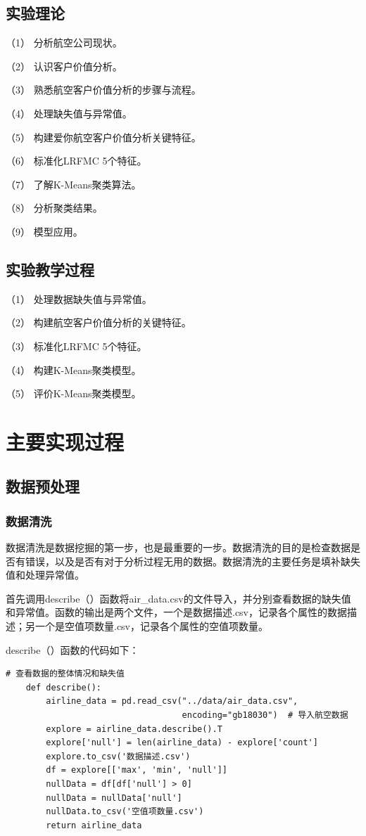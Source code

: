 \documentclass[UTF8,12pt]{article}
\begin{document}
\subsection{实验理论}
（1） 分析航空公司现状。

（2） 认识客户价值分析。

（3） 熟悉航空客户价值分析的步骤与流程。

（4） 处理缺失值与异常值。

（5） 构建爱你航空客户价值分析关键特征。

（6） 标准化LRFMC 5个特征。

（7） 了解K-Means聚类算法。

（8） 分析聚类结果。

（9） 模型应用。

\subsection{实验教学过程}
（1） 处理数据缺失值与异常值。

（2） 构建航空客户价值分析的关键特征。

（3） 标准化LRFMC 5个特征。

（4） 构建K-Means聚类模型。

（5） 评价K-Means聚类模型。

\section{主要实现过程}
\subsection{数据预处理}
\subsubsection{数据清洗}
数据清洗是数据挖掘的第一步，也是最重要的一步。数据清洗的目的是检查数据是否有错误，以及是否有对于分析过程无用的数据。数据清洗的主要任务是填补缺失值和处理异常值。

首先调用describe（）函数将air\_data.csv的文件导入，并分别查看数据的缺失值和异常值。函数的输出是两个文件，一个是数据描述.csv，记录各个属性的数据描述；另一个是空值项数量.csv，记录各个属性的空值项数量。

describe（）函数的代码如下：
\begin{lstlisting}[title=describe（）函数,frame=shadowbox]
    # 查看数据的整体情况和缺失值
    def describe():
        airline_data = pd.read_csv("../data/air_data.csv",
                                   encoding="gb18030")  # 导入航空数据
        explore = airline_data.describe().T
        explore['null'] = len(airline_data) - explore['count']
        explore.to_csv('数据描述.csv')
        df = explore[['max', 'min', 'null']]
        nullData = df[df['null'] > 0]
        nullData = nullData['null']
        nullData.to_csv('空值项数量.csv')
        return airline_data
\end{lstlisting}
\end{document}
